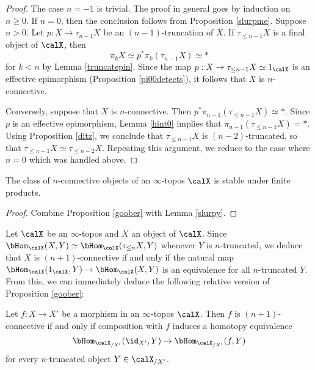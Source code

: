 \begin{proof}
The case $n=-1$ is trivial. The proof in general goes by induction on $n \geq 0$. If $n=0$, then the
conclusion follows from Proposition \ref{slurpme}. 
Suppose $n > 0$. Let $p: X \rightarrow \tau_{n-1} X$ be an $(n-1)$-truncation of
$X$. If $\tau_{\leq n-1} X$ is a final object of $\calX$, then 
$$\pi_{k} X \simeq p^{\ast} \pi_k(\tau_{n-1} X) \simeq \ast$$ 
for $k < n$ by Lemma \ref{truncatepin}. Since 
the map $p: X \rightarrow \tau_{\leq n-1} X \simeq 1_{\calX}$ is an effective epimorphism
(Proposition \ref{pi00detects}), it follows that $X$ is $n$-connective.

Conversely, suppose that $X$ is $n$-connective. Then $p^{\ast}
\pi_{n-1}(\tau_{\leq n-1} X) \simeq \ast$. Since $p$ is an effective epimorphism, Lemma \ref{hint0} implies that
$\pi_{n-1}(\tau_{\leq n-1} X) = \ast$. Using Proposition \ref{ditz}, we conclude that $\tau_{\leq n-1} X$ is
$(n-2)$-truncated, so that $\tau_{\leq n-1} X \simeq \tau_{\leq n-2} X$.
Repeating this argument, we reduce to the case where $n=0$ which was handled above.
\end{proof}

\begin{corollary}\label{togoto}
The class of $n$-connective objects of an $\infty$-topos $\calX$ is stable under finite products.
\end{corollary}

\begin{proof}
Combine Proposition \ref{goober} with Lemma \ref{slurpy}. 
\end{proof}

Let $\calX$ be an $\infty$-topos and $X$ an object of $\calX$. 
Since $\bHom_{\calX}(X,Y) \simeq \bHom_{\calX}(\tau_{\leq n} X, Y)$ whenever
$Y$ is $n$-truncated, we deduce that $X$ is $(n+1)$-connective if and
only if the natural map $\bHom_{\calX}(1_{\calX},Y) \rightarrow \bHom_{\calX}(X,Y)$ is an
equivalence for all $n$-truncated $Y$. From this, we can
immediately deduce the following relative version of Proposition
\ref{goober}:

\begin{corollary}\label{goober2}
Let $f: X \rightarrow X'$ be a morphism in an $\infty$-topos
$\calX$. Then $f$ is $(n+1)$-connective if and only if composition with $f$ induces a homotopy equivalence $$\bHom_{\calX_{/X'}}(\id_{X'},Y)
\rightarrow \bHom_{\calX_{/X'}}(f,Y)$$ 
for every $n$-truncated object $Y \in \calX_{/X'}$.
\end{corollary}

